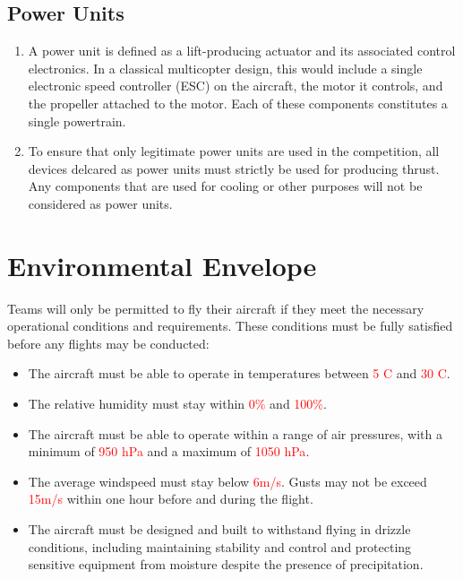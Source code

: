 \documentclass{article}
\begin{document}
\subsection{Power Units}
\begin{enumerate}
  \item A power unit is defined as a lift-producing actuator and its associated control electronics. In a classical multicopter design, this would include a single electronic speed controller (ESC) on the aircraft, the motor it controls, and the propeller attached to the motor. Each of these components constitutes a single powertrain. 
  \item To ensure that only legitimate power units are used in the competition, all devices delcared as power units must strictly be used for producing thrust. Any components that are used for cooling or other purposes will not be considered as power units.
\end{enumerate}


\newpage
\newpage

\section{Environmental Envelope}
Teams will only be permitted to fly their aircraft if they meet the necessary operational conditions and requirements. These conditions must be fully satisfied before any flights may be conducted:
\begin {itemize}
  \item The aircraft must be able to operate in temperatures between \textcolor{red}{5 \degree C} and \textcolor{red}{30 \degree C}.
  \item The relative humidity must stay within \textcolor{red}{0\%} and \textcolor{red}{100\%}. 
  \item The aircraft must be able to operate within a range of air pressures, with a minimum of \textcolor{red}{950 hPa} and a maximum of \textcolor{red}{1050 hPa}.
  \item The average windspeed must stay below \textcolor{red}{6m/s}. Gusts may not be exceed \textcolor{red}{15m/s} within one hour before and during the flight.
  \item The aircraft must be designed and built to withstand flying in drizzle conditions, including maintaining stability and control and protecting sensitive equipment from moisture despite the presence of precipitation.
  
\end {itemize}
\end{document}
